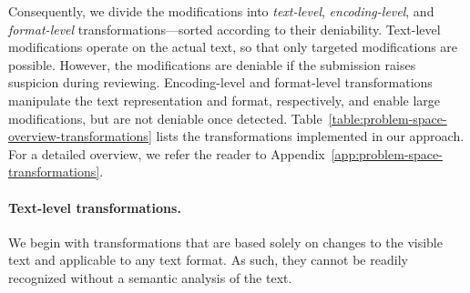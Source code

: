 \documentclass[letterpaper,twocolumn,10pt]{article}
\begin{document}
\begin{table}[t]
\centering
\footnotesize
\caption{\textbf{Problem-space transformations.} Overview of transformations to realize modifications in the problem space. They are grouped by deniability (text, encoding, format) and the capability to add or delete words. For a detailed description, see Appendix~\ref{app:problem-space-transformations}.}
\vspace{-0.1cm}
\label{table:problem-space-overview-transformations}
\vspace{-1.5em}
\end{table} 
Consequently, we divide the modifications into \emph{text-level}, \emph{encoding-level}, and \emph{format-level} transformations---sorted according to their deniability. Text-level modifications operate on the actual text, so that only targeted modifications are possible. However, the modifications are deniable if the submission raises suspicion during reviewing. Encoding-level and format-level transformations manipulate the text representation and format, respectively, and enable large modifications, but are not deniable once detected.
Table~\ref{table:problem-space-overview-transformations} lists the transformations implemented in our approach. For a detailed overview, we refer the reader to Appendix~\ref{app:problem-space-transformations}.

\paragraph{Text-level transformations.}
We begin with transformations that are based solely on changes to the visible text and applicable to any text format. As such, they cannot be {readily\EndAccSupp{}} recognized without a semantic analysis of the text.
\end{document}
